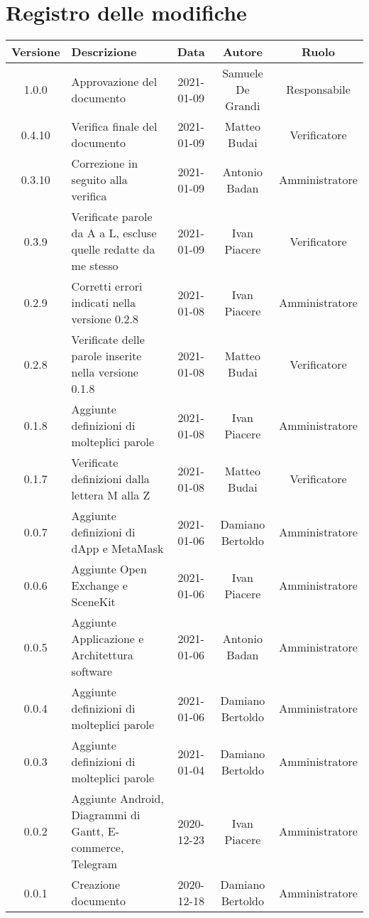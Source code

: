 \section*{Registro delle modifiche}

\begin{center}
	\begin{longtable}{|c|p{5cm}|c|c|c|}
	\hline
	\rowcolor{lighter-grayer}
	\textbf{Versione} & \textbf{Descrizione} & \textbf{Data} & \textbf{Autore} & \textbf{Ruolo} \\
	\hline
	\endfirsthead

	1.0.0 & Approvazione del documento & 2021-01-09 & Samuele De Grandi & Responsabile \\
	\hline
	0.4.10 & Verifica finale del documento & 2021-01-09 & Matteo Budai & Verificatore \\
	\hline
	0.3.10 & Correzione in seguito alla verifica & 2021-01-09 & Antonio Badan & Amministratore \\
	\hline
	0.3.9 & Verificate parole da A a L, escluse quelle redatte da me stesso & 2021-01-09 & Ivan Piacere & Verificatore \\
	\hline
	0.2.9 & Corretti errori indicati nella versione 0.2.8 & 2021-01-08 & Ivan Piacere & Amministratore \\
	\hline
	0.2.8 & Verificate delle parole inserite nella versione 0.1.8 & 2021-01-08 & Matteo Budai & Verificatore \\
	\hline
	0.1.8 & Aggiunte definizioni di molteplici parole & 2021-01-08 & Ivan Piacere & Amministratore \\
	\hline
	0.1.7 & Verificate definizioni dalla lettera M alla Z & 2021-01-08 & Matteo Budai & Verificatore \\
	\hline
	0.0.7 & Aggiunte definizioni di dApp e MetaMask & 2021-01-06 & Damiano Bertoldo & Amministratore \\
	\hline
	0.0.6 & Aggiunte Open Exchange e SceneKit & 2021-01-06 & Ivan Piacere & Amministratore \\
	\hline
	0.0.5 & Aggiunte Applicazione e Architettura software & 2021-01-06 & Antonio Badan & Amministratore \\
	\hline
	0.0.4 & Aggiunte definizioni di molteplici parole & 2021-01-06 & Damiano Bertoldo & Amministratore \\
	\hline
	0.0.3 & Aggiunte definizioni di molteplici parole & 2021-01-04 & Damiano Bertoldo & Amministratore \\
	\hline
	0.0.2 & Aggiunte Android, Diagrammi di Gantt, E-commerce, Telegram & 2020-12-23 & Ivan Piacere & Amministratore \\
	\hline
	0.0.1 & Creazione documento & 2020-12-18 & Damiano Bertoldo & Amministratore \\
	\hline

	\end{longtable}
\end{center}